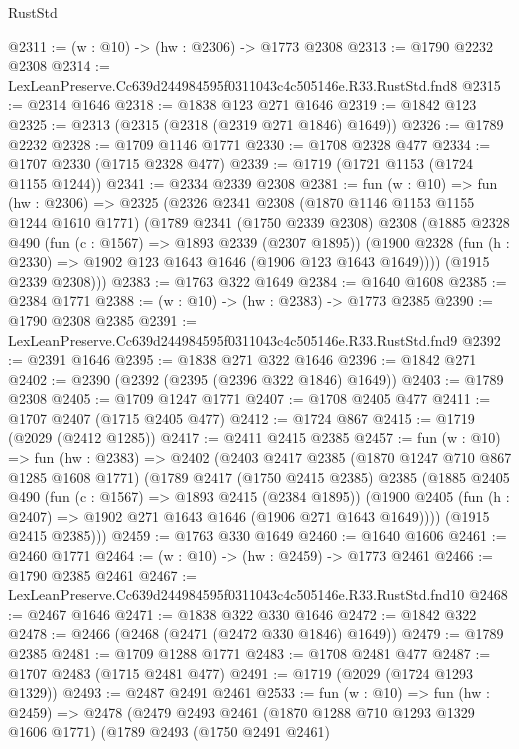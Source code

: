 \begin{lexlean}{RustStd}
\begin{coremodule}
@2311 := (w : @10) -> (hw : @2306) -> @1773 @2308
@2313 := @1790 @2232 @2308
@2314 := LexLeanPreserve.Cc639d244984595f0311043c4c505146e.R33.RustStd.fnd8
@2315 := @2314 @1646
@2318 := @1838 @123 @271 @1646
@2319 := @1842 @123
@2325 := @2313 (@2315 (@2318 (@2319 @271 @1846) @1649))
@2326 := @1789 @2232
@2328 := @1709 @1146 @1771
@2330 := @1708 @2328 @477
@2334 := @1707 @2330 (@1715 @2328 @477)
@2339 := @1719 (@1721 @1153 (@1724 @1155 @1244))
@2341 := @2334 @2339 @2308
@2381 := fun (w : @10) =>
  fun (hw : @2306) =>
  @2325
    (@2326
      @2341
      @2308
      (@1870 @1146 @1153 @1155 @1244 @1610 @1771)
      (@1789
        @2341
        (@1750 @2339 @2308)
        @2308
        (@1885
          @2328
          @490
          (fun (c : @1567) => @1893 @2339 (@2307 @1895))
          (@1900 @2328 (fun (h : @2330) => @1902 @123 @1643 @1646 (@1906 @123 @1643 @1649))))
        (@1915 @2339 @2308)))
@2383 := @1763 @322 @1649
@2384 := @1640 @1608
@2385 := @2384 @1771
@2388 := (w : @10) -> (hw : @2383) -> @1773 @2385
@2390 := @1790 @2308 @2385
@2391 := LexLeanPreserve.Cc639d244984595f0311043c4c505146e.R33.RustStd.fnd9
@2392 := @2391 @1646
@2395 := @1838 @271 @322 @1646
@2396 := @1842 @271
@2402 := @2390 (@2392 (@2395 (@2396 @322 @1846) @1649))
@2403 := @1789 @2308
@2405 := @1709 @1247 @1771
@2407 := @1708 @2405 @477
@2411 := @1707 @2407 (@1715 @2405 @477)
@2412 := @1724 @867
@2415 := @1719 (@2029 (@2412 @1285))
@2417 := @2411 @2415 @2385
@2457 := fun (w : @10) =>
  fun (hw : @2383) =>
  @2402
    (@2403
      @2417
      @2385
      (@1870 @1247 @710 @867 @1285 @1608 @1771)
      (@1789
        @2417
        (@1750 @2415 @2385)
        @2385
        (@1885
          @2405
          @490
          (fun (c : @1567) => @1893 @2415 (@2384 @1895))
          (@1900 @2405 (fun (h : @2407) => @1902 @271 @1643 @1646 (@1906 @271 @1643 @1649))))
        (@1915 @2415 @2385)))
@2459 := @1763 @330 @1649
@2460 := @1640 @1606
@2461 := @2460 @1771
@2464 := (w : @10) -> (hw : @2459) -> @1773 @2461
@2466 := @1790 @2385 @2461
@2467 := LexLeanPreserve.Cc639d244984595f0311043c4c505146e.R33.RustStd.fnd10
@2468 := @2467 @1646
@2471 := @1838 @322 @330 @1646
@2472 := @1842 @322
@2478 := @2466 (@2468 (@2471 (@2472 @330 @1846) @1649))
@2479 := @1789 @2385
@2481 := @1709 @1288 @1771
@2483 := @1708 @2481 @477
@2487 := @1707 @2483 (@1715 @2481 @477)
@2491 := @1719 (@2029 (@1724 @1293 @1329))
@2493 := @2487 @2491 @2461
@2533 := fun (w : @10) =>
  fun (hw : @2459) =>
  @2478
    (@2479
      @2493
      @2461
      (@1870 @1288 @710 @1293 @1329 @1606 @1771)
      (@1789
        @2493
        (@1750 @2491 @2461)

\end{coremodule}
\end{lexlean}
